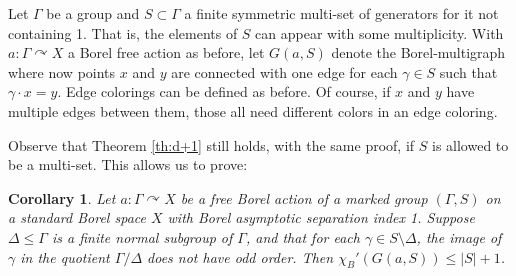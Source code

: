 \documentclass[12pt]{article}
\newcommand{\0}{\varnothing}
\newtheorem{corollary}{Corollary}
\begin{document}
Let $\Gamma$ be a group and $S \subset \Gamma$ a finite symmetric multi-set of generators for it not containing 1. That is, the elements of $S$ can appear with some multiplicity. With $a:\Gamma \curvearrowright X$ a Borel free action as before, let $G(a,S)$ denote the Borel-multigraph where now points $x$ and $y$ are connected with one edge for each $\gamma \in S$ such that $\gamma \cdot x = y$. Edge colorings can be defined as before. Of course, if $x$ and $y$ have multiple edges between them, those all need different colors in an edge coloring.

Observe that Theorem \ref{th:d+1} still holds, with the same proof, if $S$ is allowed to be a multi-set. This allows us to prove:

\begin{corollary}\label{cor:d+1}
Let $a:\Gamma \curvearrowright X$ be a free Borel action of a marked group $(\Gamma,S)$ on a standard Borel space $X$ with Borel asymptotic separation index 1. Suppose $\Delta \leq \Gamma$ is a finite normal subgroup of $\Gamma$, and that for each $\gamma \in S \setminus \Delta$, the image of $\gamma$ in the quotient $\Gamma/\Delta$ does not have odd order. Then $\chi_B'(G(a,S)) \leq |S|+1$.
\end{corollary}
\end{document}
